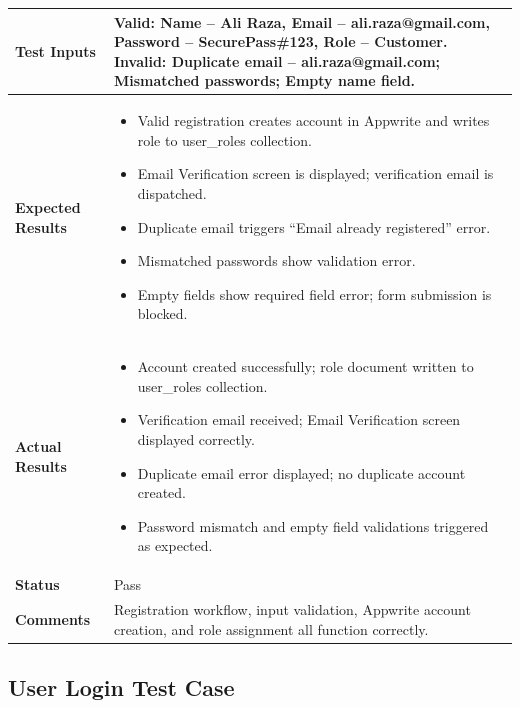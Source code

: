 \begin{table}[H]
\begin{tabular}{|p{3.2cm}|p{10.8cm}|}
\textbf{Test Inputs} &
Valid: Name -- Ali Raza, Email -- ali.raza@gmail.com, Password -- SecurePass\#123, Role -- Customer. \newline
Invalid: Duplicate email -- ali.raza@gmail.com; Mismatched passwords; Empty name field. \\ \hline
\textbf{Expected Results} &
\begin{itemize}[leftmargin=*,noitemsep]
\item Valid registration creates account in Appwrite and writes role to user\_roles collection.
\item Email Verification screen is displayed; verification email is dispatched.
\item Duplicate email triggers ``Email already registered'' error.
\item Mismatched passwords show validation error.
\item Empty fields show required field error; form submission is blocked.
\end{itemize} \\ \hline
\textbf{Actual Results} &
\begin{itemize}[leftmargin=*,noitemsep]
\item Account created successfully; role document written to user\_roles collection.
\item Verification email received; Email Verification screen displayed correctly.
\item Duplicate email error displayed; no duplicate account created.
\item Password mismatch and empty field validations triggered as expected.
\end{itemize} \\ \hline
\textbf{Status} & Pass \\ \hline
\textbf{Comments} & Registration workflow, input validation, Appwrite account creation, and role assignment all function correctly. \\ \hline
\end{tabular}
\end{table}

\newpage
\subsection{User Login Test Case}

